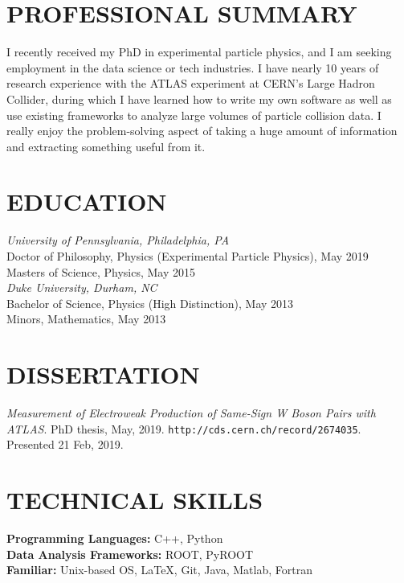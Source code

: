\documentclass{res}
\begin{document}
\begin{resume}

 

\section{PROFESSIONAL SUMMARY}
    I recently received my PhD in experimental particle physics, and I am seeking employment in the data science or tech industries.
    I have nearly 10 years of research experience with the ATLAS experiment at CERN's Large Hadron Collider, during which I have learned how to write my own software as well as use existing frameworks to analyze large volumes of particle collision data.
    I really enjoy the problem-solving aspect of taking a huge amount of information and extracting something useful from it.

\section{EDUCATION}          
    {\it University of Pennsylvania, Philadelphia, PA} \\
    Doctor of Philosophy, Physics (Experimental Particle Physics), May 2019 \\
    Masters of Science, Physics, May 2015 \\
    \newline
    {\it Duke University, Durham, NC} \\        
    Bachelor of Science, Physics (High Distinction), May 2013   \\       
    Minors, Mathematics, May 2013 
 
\section{DISSERTATION}
    {\it Measurement of Electroweak Production of Same-Sign W Boson Pairs with ATLAS}.  PhD thesis, May, 2019. {\tt http://cds.cern.ch/record/2674035}. Presented 21 Feb, 2019.

\section{TECHNICAL SKILLS}
    {\bf Programming Languages:} C++, Python\\
    {\bf Data Analysis Frameworks:} ROOT, PyROOT\\
    {\bf Familiar:} Unix-based OS, \LaTeX, Git, Java, Matlab, Fortran


\end{resume}
\end{document}
